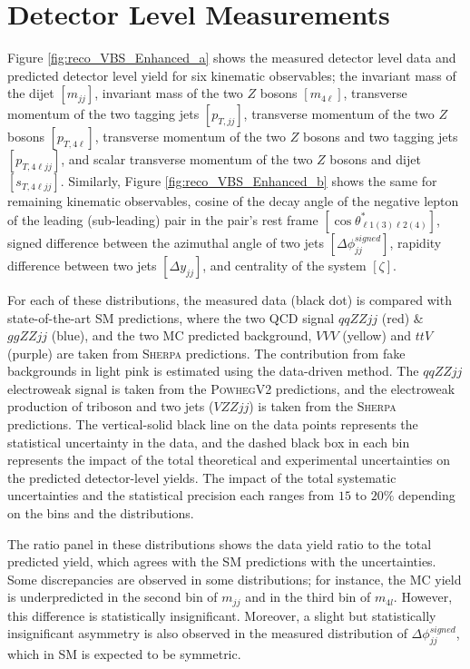 \section{ Detector Level Measurements }
\label{sec:DetectorLevel_Measurement}

Figure \ref{fig:reco_VBS_Enhanced_a} shows the measured detector level data and predicted detector level yield for six kinematic observables; the invariant mass of the dijet $[m_{jj}]$, invariant mass of the two $Z$ bosons $[m_{4\ell}]$, transverse momentum of the two tagging jets $[p_{T,jj}]$, transverse momentum of the two $Z$ bosons $[p_{T,4\ell}]$, transverse momentum of the two $Z$ bosons and two tagging jets $[p_{T,4\ell jj}]$, and scalar transverse momentum of the two $Z$ bosons and dijet $[s_{T,4\ell jj}]$. Similarly, Figure \ref{fig:reco_VBS_Enhanced_b} shows the same for remaining kinematic observables, cosine of the decay angle of the negative lepton of the leading (sub-leading) pair in the pair's rest frame $[\cos \theta^{*}_{\ell 1 (3) \ell 2 (4)}]$, signed difference between the azimuthal angle of two jets $[\Delta \phi _{jj}^{signed}]$, rapidity difference between two jets $[\Delta y_{jj}]$, and centrality of the system $[\zeta]$.

For each of these distributions, the measured data (black dot) is compared with state-of-the-art SM predictions, where the two QCD signal $qqZZjj$ (red) $\&$ $ggZZjj$ (blue), and the two MC predicted background, $VVV$ (yellow) and $ttV$ (purple) are taken from \textsc{Sherpa} predictions. The contribution from fake backgrounds in light pink is estimated using the data-driven method. The $qqZZjj$ electroweak signal is taken from the \textsc{PowhegV2} predictions, and the electroweak production of triboson and two jets ($VZZjj$) is taken from the \textsc{Sherpa} predictions. The vertical-solid black line on the data points represents the statistical uncertainty in the data, and the dashed black box in each bin represents the impact of the total theoretical and experimental uncertainties on the predicted detector-level yields. The impact of the total systematic uncertainties and the statistical precision each ranges from $15$ to $20\%$ depending on the bins and the distributions. 

The ratio panel in these distributions shows the data yield ratio to the total predicted yield, which agrees with the SM predictions with the uncertainties. Some discrepancies are observed in some distributions; for instance, the MC yield is underpredicted in the second bin of $m_{jj}$ and in the third bin of $m_{4l}$. However, this difference is statistically insignificant. Moreover, a slight but statistically insignificant asymmetry is also observed in the measured distribution of $\Delta \phi _{jj}^{signed}$, which in SM is expected to be symmetric. 

